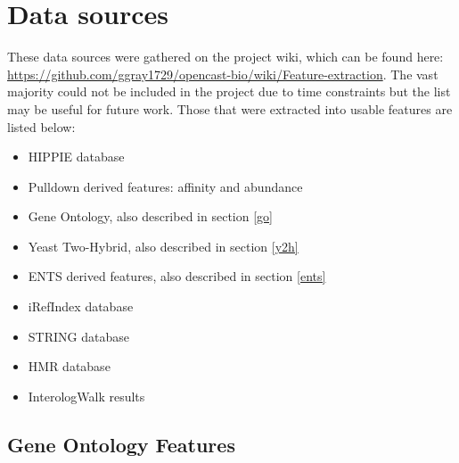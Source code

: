 \section{Data sources}
\label{datasources}

These data sources were gathered on the project wiki, which can be found here: \url{https://github.com/ggray1729/opencast-bio/wiki/Feature-extraction}.
The vast majority could not be included in the project due to time constraints but the list may be useful for future work.
Those that were extracted into usable features are listed below:

\begin{itemize}
    \item HIPPIE database\autocite{schaefer_hippie:_2012}
    \item Pulldown derived features: affinity and abundance
    \item Gene Ontology\autocite{ashburner_gene_2000}, also described in section \ref{go}
    \item Yeast Two-Hybrid, also described in section \ref{y2h}
    \item ENTS derived features\autocite{rodgers-melnick_predicting_2013}, also described in section \ref{ents}
    \item iRefIndex database\autocite{razick_irefindex:_2008}
    \item STRING database\autocite{von_mering_string_2005}
    \item HMR database
    \item InterologWalk results\autocite{gallone_bio::homology::interologwalk_2011}
\end{itemize}


\subsection{Gene Ontology Features}
\label{app:go}

